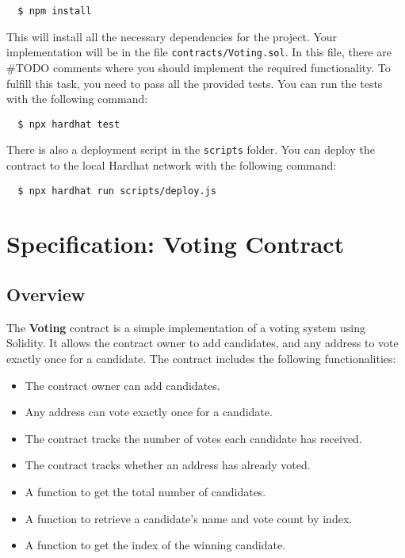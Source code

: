 \documentclass[12pt]{article}
\begin{document}
\begin{verbatim}
  $ npm install
\end{verbatim}
This will install all the necessary dependencies for the project. Your implementation will be in the file \texttt{contracts/Voting.sol}. In this file, there are \#TODO comments where you should implement the required functionality. To fulfill this task, you need to pass all the provided tests. You can run the tests with the following command:

\begin{verbatim}
  $ npx hardhat test
\end{verbatim}

There is also a deployment script in the \texttt{scripts} folder. You can deploy the contract to the local Hardhat network with the following command:
\begin{verbatim}
  $ npx hardhat run scripts/deploy.js
\end{verbatim}

\section{Specification: Voting Contract}

\subsection{Overview}

The \textbf{Voting} contract is a simple implementation of a voting system using Solidity. It allows the contract owner to add candidates, and any address to vote exactly once for a candidate. The contract includes the following functionalities:
\begin{itemize}
    \item The contract owner can add candidates.
    \item Any address can vote exactly once for a candidate.
    \item The contract tracks the number of votes each candidate has received.
    \item The contract tracks whether an address has already voted.
    \item A function to get the total number of candidates.
    \item A function to retrieve a candidate's name and vote count by index.
    \item A function to get the index of the winning candidate.
\end{itemize}
\end{document}
